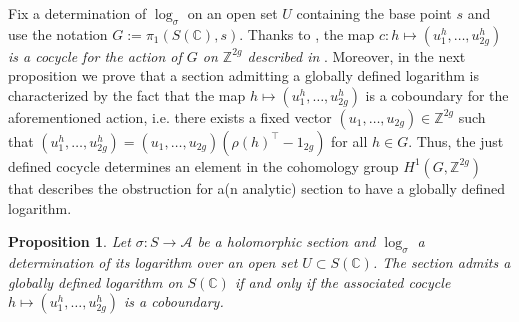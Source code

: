 \documentclass[10 pt,a4paper]{article}
\theoremstyle{plain}
\newtheorem{prop}[thm]{Proposition}
\theoremstyle{definition}
\theoremstyle{named}
\newcommand{\cA}{\mathcal A}
\newcommand{\bC}{\mathbb C}
\newcommand{\bZ}{\mathbb Z}
\begin{document}
Fix a determination of $\log_\sigma$ on an open set $U$ containing the base point $s$ and use the notation $G:=\pi_1(S(\bC),s)$. Thanks to , the map $c: h \mapsto (u_1^h,\ldots, u_{2g}^h)$ \emph{is a cocycle for the action of $G$ on $\bZ^{2g}$ described in }. Moreover, in the next proposition we prove that a section admitting a globally defined logarithm is characterized by the fact that the map $h \mapsto (u_1^h,\ldots, u_{2g}^h)$ is a coboundary for the aforementioned action, i.e. there exists a fixed vector $(u_1,\ldots,u_{2g}) \in \bZ^{2g}$ such that $(u_1^h,\ldots, u_{2g}^h) = (u_1,\ldots,u_{2g})(\rho(h)^\top-1_{2g})$ for all $h \in G$. Thus, the just defined cocycle determines an element in the cohomology group $H^1(G,\bZ^{2g})$ that describes the obstruction for a(n analytic) section to have a globally defined logarithm.

\begin{prop}\label{coboundary}
	Let $\sigma:S\rightarrow \cA$ be a holomorphic section and $\log_\sigma$ a determination of its logarithm over an open set $U\subset S(\bC)$. The section admits a globally defined logarithm on $S(\bC)$ if and only if the associated cocycle $h \mapsto (u_1^h,\ldots, u_{2g}^h)$ is a coboundary.
\end{prop}
\end{document}
